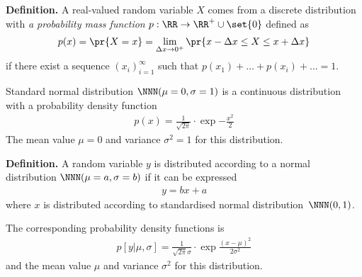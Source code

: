 \documentclass[landscape,footrule]{foils}
\begin{document}


\textbf{Definition.}
A real-valued random variable $X$ comes from a discrete distribution with \emph{a probability mass function} $p:\RR\to\RR^+\cup\set{0}$ defined as 
\begin{align*}
p(x)=\pr{X=x}=\lim_{\Delta x \to 0^+} \pr{x-\Delta x \leq X\leq x+\Delta x}
\end{align*}  
if there exist a sequence $(x_i)_{i=1}^\infty$ such that $p(x_1)+\ldots+p(x_i)+\ldots =1$.




Standard normal distribution $\NNN(\mu=0,\sigma=1)$ is a continuous distribution with a probability density function 
\begin{align*}
p(x)=\frac{1}{\sqrt{2\pi}}\cdot\exp{-\frac{x^2}{2}}
\end{align*}
The mean value $\mu=0$ and variance $\sigma^2=1$ for this distribution.



\textbf{Definition.}
A random variable $y$ is distributed according to a normal distribution $\NNN(\mu=a,\sigma=b)$ if it can be expressed 
\begin{align*}
y=bx+a
\end{align*}
where $x$ is distributed according to standardised normal distribution~$\NNN(0,1)$. \vspace*{1cm}

The corresponding probability density functions is
\begin{align*}
p[y|\mu,\sigma]=\frac{1}{\sqrt{2\pi}\sigma}\cdot\exp{\frac{(x-\mu)^2}{2\sigma^2}}
\end{align*}
and the mean value $\mu$ and variance $\sigma^2$ for this distribution.


\end{document}
